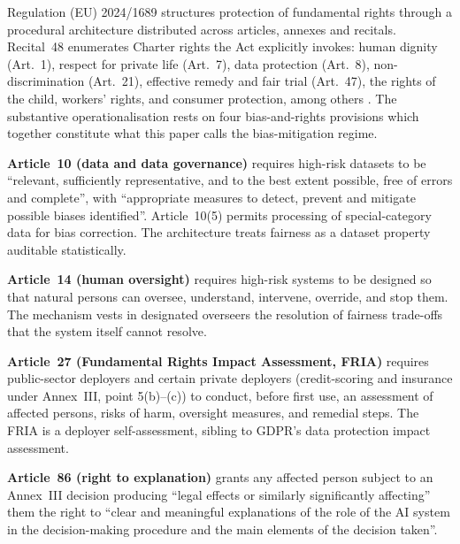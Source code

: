 \documentclass[12pt]{article}
\begin{document}
Regulation (EU) 2024/1689 \citep{aiact2024} structures protection of fundamental rights through a procedural architecture distributed across articles, annexes and recitals. Recital~48 enumerates Charter rights the Act explicitly invokes: human dignity (Art.~1), respect for private life (Art.~7), data protection (Art.~8), non-discrimination (Art.~21), effective remedy and fair trial (Art.~47), the rights of the child, workers' rights, and consumer protection, among others \citep{eucharter2000,aiact2024}. The substantive operationalisation rests on four bias-and-rights provisions which together constitute what this paper calls the bias-mitigation regime.

\textbf{Article~10 (data and data governance)} requires high-risk datasets to be \enquote{relevant, sufficiently representative, and to the best extent possible, free of errors and complete}, with \enquote{appropriate measures to detect, prevent and mitigate possible biases identified}. Article~10(5) permits processing of special-category data for bias correction. The architecture treats fairness as a dataset property auditable statistically.

\textbf{Article~14 (human oversight)} requires high-risk systems to be designed so that natural persons can oversee, understand, intervene, override, and stop them. The mechanism vests in designated overseers the resolution of fairness trade-offs that the system itself cannot resolve.

\textbf{Article~27 (Fundamental Rights Impact Assessment, FRIA)} requires public-sector deployers and certain private deployers (credit-scoring and insurance under Annex~III, point 5(b)--(c)) to conduct, before first use, an assessment of affected persons, risks of harm, oversight measures, and remedial steps. The FRIA is a deployer self-assessment, sibling to GDPR's data protection impact assessment.

\textbf{Article~86 (right to explanation)} grants any affected person subject to an Annex~III decision producing \enquote{legal effects or similarly significantly affecting} them the right to \enquote{clear and meaningful explanations of the role of the AI system in the decision-making procedure and the main elements of the decision taken}.
\end{document}
